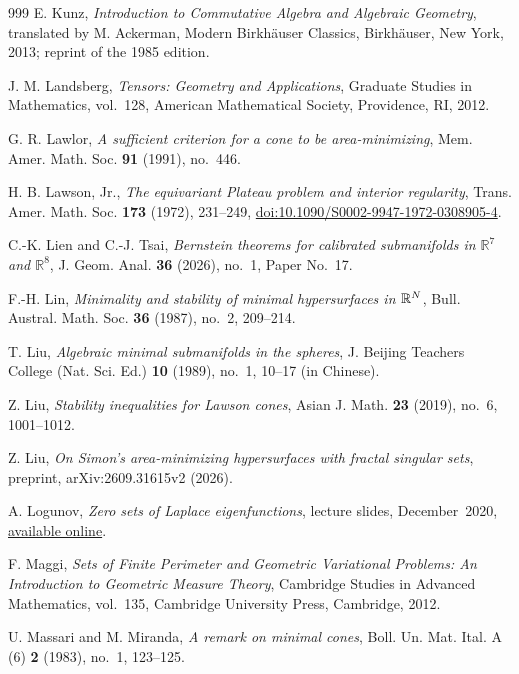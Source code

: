 \begin{thebibliography}{999}
E. Kunz,
\emph{Introduction to Commutative Algebra and Algebraic Geometry},
translated by M. Ackerman,
Modern Birkh\"auser Classics, Birkh\"auser, New York, 2013;
reprint of the 1985 edition.

J. M. Landsberg,
\emph{Tensors: Geometry and Applications},
Graduate Studies in Mathematics, vol.~128,
American Mathematical Society, Providence, RI, 2012.

G. R. Lawlor,
\emph{A sufficient criterion for a cone to be area-minimizing},
Mem. Amer. Math. Soc. \textbf{91} (1991), no.~446.

H. B. Lawson, Jr.,
\emph{The equivariant Plateau problem and interior regularity},
Trans. Amer. Math. Soc. \textbf{173} (1972), 231--249,
\href{https://doi.org/10.1090/S0002-9947-1972-0308905-4}{doi:10.1090/S0002-9947-1972-0308905-4}.

C.-K. Lien and C.-J. Tsai,
\emph{Bernstein theorems for calibrated submanifolds in
$\mathbb R^7$ and $\mathbb R^8$},
J. Geom. Anal. \textbf{36} (2026), no.~1, Paper No.~17.

F.-H. Lin,
\emph{Minimality and stability of minimal hypersurfaces in \(\mathbb R^N\)},
Bull. Austral. Math. Soc. \textbf{36} (1987), no.~2, 209--214.

T. Liu,
\emph{Algebraic minimal submanifolds in the spheres},
J. Beijing Teachers College (Nat. Sci. Ed.) \textbf{10} (1989),
no.~1, 10--17 (in Chinese).

Z. Liu,
\emph{Stability inequalities for Lawson cones},
Asian J. Math. \textbf{23} (2019), no.~6, 1001--1012.

Z. Liu,
\emph{On Simon's area-minimizing hypersurfaces with fractal singular sets},
preprint, arXiv:2609.31615v2 (2026).

A. Logunov,
\emph{Zero sets of Laplace eigenfunctions},
lecture slides, December~2020,
\href{https://www.math.chalmers.se/~larsons/seminar/previous/Fall2020/slides/Logunov_slides.pdf}{available online}.

F. Maggi,
\emph{Sets of Finite Perimeter and Geometric Variational Problems: An
Introduction to Geometric Measure Theory},
Cambridge Studies in Advanced Mathematics, vol.~135, Cambridge University
Press, Cambridge, 2012.

U. Massari and M. Miranda,
\emph{A remark on minimal cones},
Boll. Un. Mat. Ital. A (6) \textbf{2} (1983), no.~1, 123--125.


\end{thebibliography}
